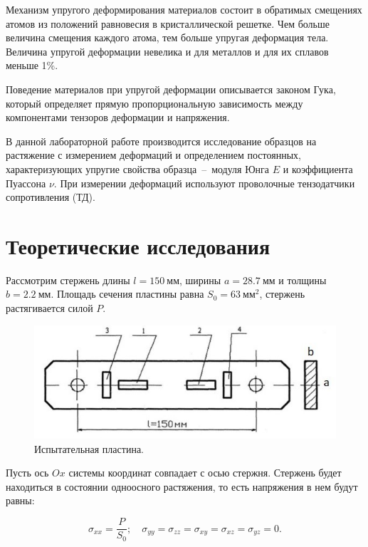 \documentclass[12pt, a4paper]{article}
\begin{document}
    Механизм упругого деформирования материалов состоит в обратимых смещениях атомов из положений равновесия в кристаллической решетке. Чем больше величина смещения каждого атома, тем больше упругая деформация тела. Величина упругой деформации невелика и для металлов и для их сплавов меньше 1\%.
    
    Поведение материалов при упругой деформации описывается законом Гука, который определяет прямую пропорциональную зависимость между компонентами тензоров деформации и напряжения.
    
    В данной лабораторной работе производится исследование образцов на растяжение с измерением деформаций и определением постоянных, характеризующих упругие свойства образца~--~модуля Юнга $E$ и коэффициента Пуассона $\nu$. При измерении деформаций используют проволочные тензодатчики сопротивления (ТД).
    
    \newpage
    
    \section{Теоретические исследования}
    
    Рассмотрим стержень длины $l = 150~\text{мм}$, ширины $a = 28.7~\text{мм}$ и толщины $b = 2.2~\text{мм}$. Площадь сечения пластины равна $S_{0} = 63~\text{мм}^{2}$, стержень растягивается силой $P$.
    
    \begin{figure}[h]
        \centering
        \includegraphics[width = 12cm]{image_1.jpg}
        \caption{Испытательная пластина.}
        \label{im1}
    \end{figure}
    
    Пусть ось $Ox$ системы координат совпадает с осью стержня. Стержень будет находиться в состоянии одноосного растяжения, то есть напряжения в 
    нем будут равны:
    
    \begin{equation}
        \sigma_{xx} = \frac{P}{S_{0}}; \quad \sigma_{yy} = \sigma_{zz}			=\sigma_{xy} = \sigma_{xz} = \sigma_{yz} = 0.
        \label{eq1}
    \end{equation}
    
\end{document}
